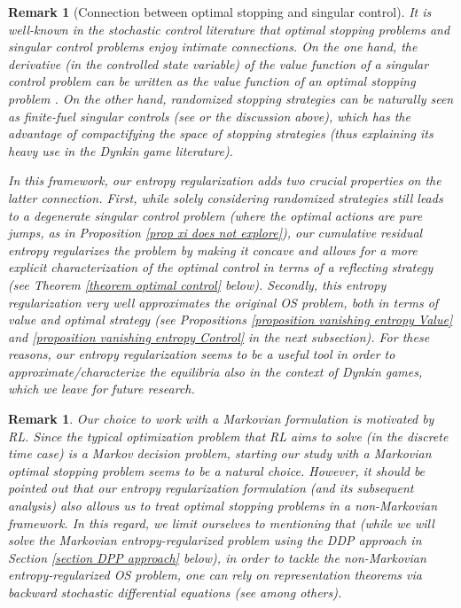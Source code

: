 \documentclass[11pt]{amsart}
\newtheorem{remark}[theorem]{Remark}
\theoremstyle{plain}
\numberwithin{equation}{section}
\begin{document}
\begin{remark}[Connection between optimal stopping and singular control] 
It is well-known in the stochastic control literature that optimal stopping problems and singular control problems enjoy intimate connections.
On the one hand,  the derivative (in the controlled state variable) of the value function of a singular control problem can be written as the value function of an optimal stopping problem \cite{bather1966continuous,boetius1998connections,de2018stochastic,guo2009class,Karatzas&Shreve84}.
On the other hand, randomized stopping strategies can be naturally seen as finite-fuel singular controls (see \cite{touzi.vieille.2002continuous} or the discussion above), which has the advantage of compactifying the space of stopping strategies (thus explaining its heavy use in the Dynkin game literature).

In this framework, our entropy regularization  adds two crucial properties on the latter connection. 
First, while solely considering randomized strategies still leads to a degenerate singular control problem (where the optimal actions are pure jumps, as in Proposition \ref{prop xi does not explore}), our cumulative residual entropy regularizes the problem by making it concave and allows for a more explicit characterization of the optimal control in terms of a reflecting strategy (see Theorem \ref{theorem optimal control} below). Secondly, this entropy regularization very well approximates the original OS problem, both in terms of value and optimal strategy (see Propositions \ref{proposition vanishing entropy Value} and \ref{proposition vanishing entropy Control} in the next subsection). For these reasons, our entropy regularization seems to be a useful tool in order to approximate/characterize the equilibria also in the context of Dynkin games, which we leave for future research.
\end{remark}

\begin{remark}
Our choice to work with a Markovian formulation is motivated by RL. 
Since the typical optimization problem that RL aims to solve (in the discrete time case) is a Markov decision problem, starting our study with a Markovian optimal stopping problem seems to be a natural choice. 
However, it should be pointed out that our entropy regularization formulation (and its subsequent analysis) also allows us to treat optimal stopping problems in a non-Markovian framework. 
In this regard, we limit ourselves to mentioning that (while we will solve the Markovian entropy-regularized problem using the DDP approach in Section \ref{section DPP approach} below), in order to tackle the non-Markovian entropy-regularized OS problem, one can rely on representation theorems via backward stochastic differential equations (see \cite{bank&elkaroui2004, Bank&Riedel01} among others).
\end{remark}
\end{document}
